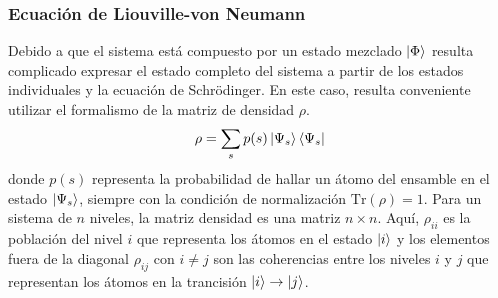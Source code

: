 \subsubsection*{Ecuación de Liouville-von Neumann}
Debido a que el sistema está compuesto por un estado mezclado $\ket{\Phi}$ resulta complicado expresar el estado completo del sistema a partir de los estados individuales y la ecuación de Schrödinger. En este caso, resulta conveniente utilizar el formalismo de la matriz de densidad $\rho$.
\begin{equation}
    \rho = \sum_s p(s) \ket{\Psi_s}\bra{\Psi_s}
\end{equation}
donde $p(s)$ representa la probabilidad de hallar un átomo del ensamble en el estado $\ket{\Psi_s}$, siempre con la condición de normalización $\text{Tr}(\rho) = 1$. Para un sistema de $n$ niveles, la matriz densidad es una matriz $n \times n$. Aquí, $\rho_{ii}$ es la población del nivel $i$ que representa los átomos en el estado $\ket{i}$ y los elementos fuera de la diagonal $\rho_{ij}$ con $i \neq j$ son las coherencias entre los niveles $i$ y $j$ que representan los átomos en la trancisión $\ket{i} \to \ket{j}$. 

